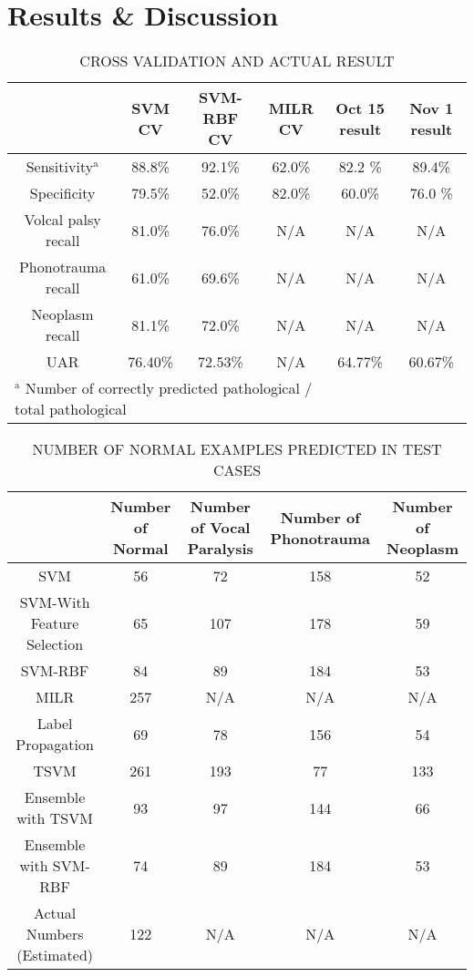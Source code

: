 \section{Results \& Discussion}
\begin{table*}[htbp]
	\caption{CROSS VALIDATION AND ACTUAL RESULT}
	\begin{center}
		\begin{tabular}{|c|c|c|c|c|c|}
			\hline
			 & SVM CV & SVM-RBF CV & MILR CV & Oct 15 result & Nov 1 result \\
			\hline
			Sensitivity$^{\mathrm{a}}$  & 88.8\%& 92.1\% & 62.0\% & 82.2 \% & 89.4\% \\
			\hline
			Specificity & 79.5\% & 52.0\%& 82.0\%& 60.0\% & 76.0 \% \\
			\hline
			Volcal palsy recall & 81.0\% &76.0\%& N/A & N/A & N/A \\
			\hline
			Phonotrauma recall & 61.0\% &69.6\%& N/A& N/A& N/A\\
			\hline
			Neoplasm recall & 81.1\% & 72.0\%& N/A& N/A& N/A \\
			\hline
			UAR & 76.40\% &72.53\% & N/A& 64.77\% & 60.67\%\\
			\hline
			\multicolumn{4}{l}{$^{\mathrm{a}}$ Number of correctly predicted pathological / total pathological}
		\end{tabular}
		\label{tab:1}
	\end{center}
\end{table*}

\begin{table*}[htbp]
	\caption{NUMBER OF NORMAL EXAMPLES PREDICTED IN TEST CASES}
	\begin{center}
		\begin{tabular}{|c|c|c|c|c|}
			\hline
			& Number of Normal & Number of Vocal Paralysis & Number of Phonotrauma & Number of Neoplasm \\
			\hline
			SVM & 56 & 72 &158&52 \\
			\hline
			SVM-With Feature Selection & 65 & 107 & 178  & 59 \\
			\hline
			SVM-RBF & 84 & 89 &184 & 53 \\
			\hline
			MILR & 257 & N/A & N/A& N/A\\
			\hline
			Label Propagation & 69 & 78&156 & 54 \\
			\hline
			TSVM & 261 &193&77&133\\
			\hline
			Ensemble with TSVM & 93&97&144&66\\
			\hline
			Ensemble with SVM-RBF & 74&89&184&53\\
			\hline
			Actual Numbers (Estimated)& 122&N/A&N/A&N/A  \\
			\hline
		\end{tabular}
		\label{tab:2}
	\end{center}
\end{table*}

